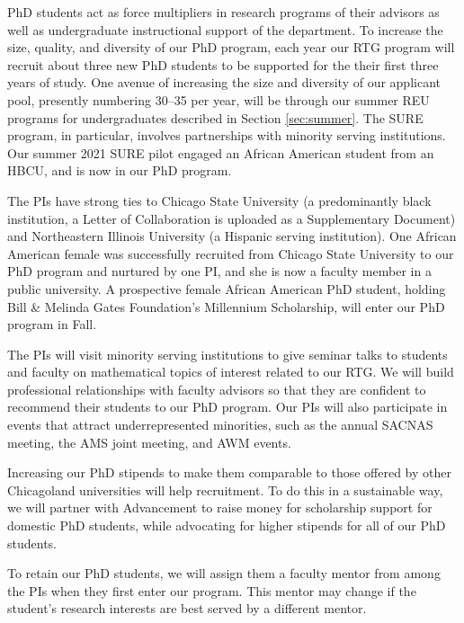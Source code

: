 \documentclass[11pt]{NSFamsart}
\begin{document}
PhD students act as force multipliers in research programs of their advisors as well as undergraduate instructional support of the department. To increase the size, quality, and diversity of our PhD program, each year our RTG program will recruit about three new PhD students to be supported for the their first three years of study.  One avenue of increasing the size and diversity of our applicant pool, presently numbering 30--35 per year, will be through our summer REU programs for undergraduates described in Section \ref{sec:summer}.  The SURE program, in particular, involves partnerships with minority serving institutions.  Our summer 2021 SURE pilot engaged an African American student from an HBCU, and is now in our PhD program.  





The PIs have strong ties to Chicago State University (a predominantly black institution, a Letter of Collaboration is uploaded as a Supplementary Document) and Northeastern Illinois   University (a Hispanic serving institution). One African American female was successfully recruited from Chicago State University to
our PhD program and nurtured by one PI, and she is now a faculty member in a public university. A prospective female  African American  PhD student,   holding Bill \& Melinda Gates Foundation's Millennium Scholarship, will enter our PhD program in Fall. 


The PIs will visit minority serving institutions to give seminar talks to students and faculty on mathematical topics of interest related to our RTG.  We will build professional relationships with faculty advisors so that they are confident to recommend their students to our PhD program.  Our PIs will also participate in events that attract underrepresented minorities, such as the annual SACNAS meeting, the AMS joint meeting, and AWM events.

Increasing our PhD stipends to make them comparable to those offered by other Chicagoland universities will help recruitment. To do this in a sustainable way, we will partner with Advancement to raise money for scholarship support for domestic PhD students, while advocating for higher stipends for all of our PhD students.

To retain our PhD students, we will assign them a faculty mentor from among the PIs when they first enter our program.  This mentor may change if the student's research interests are best served by a different mentor.  
\end{document}
